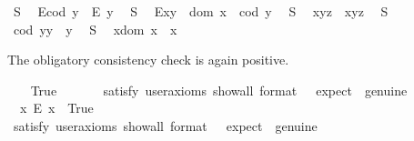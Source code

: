 \begin{isabellebody}
\ S{}{\isacharcolon}\ %
\ {\isachardoublequoteopen}E{\isacharparenleft}cod\ y{\isacharparenright}\ \isactrlbold {\isasymrightarrow}\ E\ y{\isachardoublequoteclose}\ \isanewline
\ S{}{\isacharcolon}\ %
\ {\isachardoublequoteopen}E{\isacharparenleft}x{\isasymcdot}y{\isacharparenright}\ \isactrlbold {\isasymleftrightarrow}\ dom\ x\ {\isasymsimeq}\ cod\ y{\isachardoublequoteclose}\ \isanewline
\ S{}{\isacharcolon}\ %
\ {\isachardoublequoteopen}x{\isasymcdot}{\isacharparenleft}y{\isasymcdot}z{\isacharparenright}\ {\isasymcong}\ {\isacharparenleft}x{\isasymcdot}y{\isacharparenright}{\isasymcdot}z{\isachardoublequoteclose}\ \isanewline
\ S{}{\isacharcolon}\ %
\ {\isachardoublequoteopen}{\isacharparenleft}cod\ y{\isacharparenright}{\isasymcdot}y\ {\isasymcong}\ y{\isachardoublequoteclose}\ \isanewline
\ S{}{\isacharcolon}\ %
\ {\isachardoublequoteopen}x{\isasymcdot}{\isacharparenleft}dom\ x{\isacharparenright}\ {\isasymcong}\ x{\isachardoublequoteclose}%
\begin{isamarkuptext}%
The obligatory consistency check is again positive.%
\end{isamarkuptext}\isamarkuptrue%
\ \ \isamarkupfalse%
\ True\ %
\isanewline
\ \ \ \ \isamarkupfalse%
\ {\isacharbrackleft}satisfy{\isacharcomma}\ user{\isacharunderscore}axioms{\isacharcomma}\ show{\isacharunderscore}all{\isacharcomma}\ format\ {\isacharequal}\ {}{\isacharcomma}\ expect\ {\isacharequal}\ genuine{\isacharbrackright}%
\isadelimproof
\ %
\endisadelimproof
%
\isatagproof
{}\isamarkupfalse%
%
\endisatagproof
{\isafoldproof}%
%
\isadelimproof
%
\endisadelimproof
\ \isanewline
\ \ \isamarkupfalse%
\ \ {\isachardoublequoteopen}{\isasymexists}x{\isachardot}\ \isactrlbold {\isasymnot}{\isacharparenleft}E\ x{\isacharparenright}{\isachardoublequoteclose}\ \ True\ \ %
\ \ \isanewline
\ \ \ \ \isamarkupfalse%
\ {\isacharbrackleft}satisfy{\isacharcomma}\ user{\isacharunderscore}axioms{\isacharcomma}\ show{\isacharunderscore}all{\isacharcomma}\ format\ {\isacharequal}\ {}{\isacharcomma}\ expect\ {\isacharequal}\ genuine{\isacharbrackright}%

\end{isabellebody}
